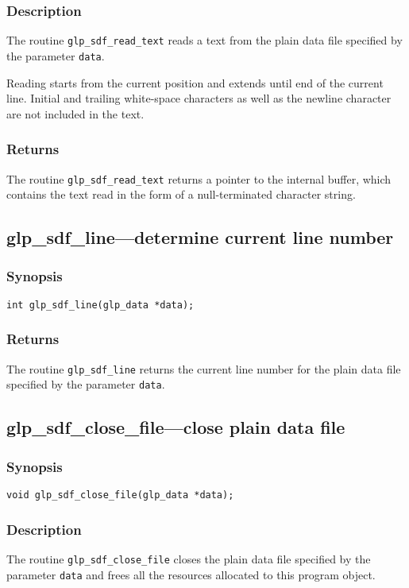 \subsubsection*{Description}

The routine \verb|glp_sdf_read_text| reads a text from the plain data
file specified by the parameter \verb|data|.

Reading starts from the current position and extends until end of the
current line. Initial and trailing white-space characters as well as
the newline character are not included in the text.

\subsubsection*{Returns}

The routine \verb|glp_sdf_read_text| returns a pointer to the internal
buffer, which contains the text read in the form of a null-terminated
character string.

\subsection{glp\_sdf\_line---determine current line number}

\subsubsection*{Synopsis}

\begin{verbatim}
int glp_sdf_line(glp_data *data);
\end{verbatim}

\subsubsection*{Returns}

The routine \verb|glp_sdf_line| returns the current line number for the
plain data file specified by the parameter \verb|data|.

\subsection{glp\_sdf\_close\_file---close plain data file}

\subsubsection*{Synopsis}

\begin{verbatim}
void glp_sdf_close_file(glp_data *data);
\end{verbatim}

\subsubsection*{Description}

The routine \verb|glp_sdf_close_file| closes the plain data file
specified by the parameter \verb|data| and frees all the resources
allocated to this program object.

